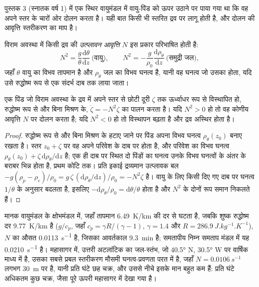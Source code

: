 पुस्तक 3 (स्नातक वर्ष 1) में एक स्थिर वायुमंडल में वायु-पिंड को ऊपर उठाने पर पाया गया था कि
वह अपने स्तर के चारों ओर दोलन करता है। यही बात किसी भी स्तरित द्रव पर लागू होती है,
और दोलन की आवृत्ति स्तरीकरण का माप है।

\begin{definition}[उत्प्लावन आवृत्ति]\label{def:b3:gfd-foundations:buoyancy}
विराम अवस्था में किसी द्रव की \emph{उत्प्लावन आवृत्ति} $N$ इस प्रकार
परिभाषित होती है:
\[
N^2 = \frac{g}{\theta}\frac{\mathrm d\theta}{\mathrm dz}\ \text{(वायु)},
\qquad
N^2 = -\frac{g}{\rho_0}\frac{\mathrm d\rho_\theta}{\mathrm dz}\ \text{(समुद्री जल)},
\]
जहाँ $\theta$ वायु का विभव तापमान है और $\rho_\theta$
जल का विभव घनत्व है, यानी वह घनत्व जो उसका होता,
यदि उसे रुद्धोष्म रूप से एक संदर्भ दाब तक लाया जाता।
\end{definition}

\begin{theorem}[विस्थापित पिंड का दोलन]\label{thm:b3:gfd-foundations:buoyancy}
एक पिंड जो विराम अवस्था के द्रव में अपने स्तर से छोटी दूरी $\zeta$ तक ऊर्ध्वाधर रूप से विस्थापित हो,
रुद्धोष्म रूप से और बिना मिश्रण के, $\ddot\zeta =
-N^2\zeta$ का पालन करता है। यदि $N^2 > 0$ हो तो वह कोणीय आवृत्ति $N$ पर दोलन करता है; यदि
$N^2 < 0$ हो तो विस्थापन बढ़ता है और द्रव अस्थिर होता है।
\end{theorem}

\begin{proof}
रुद्धोष्म रूप से और बिना मिश्रण के हटाए जाने पर पिंड अपना विभव घनत्व $\rho_\theta(z_0)$ बनाए रखता है।
स्तर $z_0 + \zeta$ पर वह अपने परिवेश के दाब पर होता है,
और परिवेश का विभव घनत्व $\rho_\theta(z_0) +
\zeta\,\mathrm d\rho_\theta/\mathrm dz$ है; एक ही दाब पर स्थित दो पिंडों का
घनत्व उनके विभव घनत्वों के अंतर के बराबर भिन्न होता है, प्रथम
कोटि तक। प्रति इकाई द्रव्यमान उत्प्लावक बल $-g(\rho_p - \rho_e)/\rho_0 =
g\,\zeta\,(\mathrm d\rho_\theta/\mathrm dz)/\rho_0 = -N^2\zeta$ है। वायु के लिए किसी दिए गए दाब पर
घनत्व $1/\theta$ के अनुसार बदलता है, इसलिए $-\mathrm
d\rho_\theta/\rho_0 = \mathrm d\theta/\theta$ होता है और $N^2$ के दोनों रूप
समान निकलते हैं।
\end{proof}

मानक वायुमंडल के क्षोभमंडल में, जहाँ तापमान
\qty{6.49}{K/km} की दर से घटता है, जबकि शुष्क रुद्धोष्म दर \qty{9.77}{K/km} है ($g/c_p$,
जहाँ $c_p = \gamma R/(\gamma - 1)$, $\gamma = 1.4$ और $R =
\qty{286.9}{J.kg^{-1}.K^{-1}}$), $N$ का औसत \qty{0.0113}{s^{-1}} है, जिसका आवर्तकाल
\qty{9.3}{min} है; समतापीय निम्न समताप मंडल में यह
\qty{0.0210}{s^{-1}} है। महासागर में, उत्तरी अटलांटिक का जल-स्तंभ, जो
\ang{40.5} N, \ang{30.5} W पर वार्षिक माध्य में है, उसका सबसे प्रबल
स्तरीकरण मौसमी घनत्व-प्रवणता परत में है, जहाँ $N = \qty{0.0106}{s^{-1}}$
लगभग \qty{30}{m} पर है, यानी प्रति घंटे छह चक्र, और उससे नीचे इसके मान बहुत कम हैं:
प्रति घंटे अधिकतम कुछ चक्र, जैसा पूरे ऊपरी महासागर में देखा गया है।

